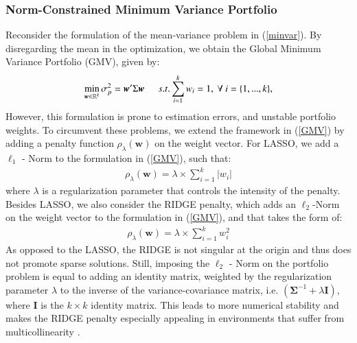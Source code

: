 \documentclass[12pt, a4paper]{article}
\newcommand{\bfw}{\boldsymbol{w} }
\newcommand{\bfSigma}{\boldsymbol{\Sigma} }
\begin{document}
\subsubsection*{Norm-Constrained Minimum Variance Portfolio}
%
Reconsider the formulation of the mean-variance problem in (\ref{minvar}). By disregarding the mean in the optimization, we obtain the Global Minimum Variance Portfolio (GMV), given by:
%
\begin{gather} \label{GMV}
\min_{\bfw \in \mathbb{R}^{k}} \sigma_{p}^{2} = \bfw'\Sigma\bfw \hspace{0.5cm}
s.t. \sum_{i=1}^{k} w_{i} = 1,\ \forall \ i=\{1,...,k\},
\end{gather}
%
However, this formulation is prone to estimation errors, and unstable portfolio weights. To circumvent these problems, we extend the framework in (\ref{GMV}) by adding a penalty function $\rho_{\lambda}(\bfw)$ on the weight vector. For LASSO, we add a $\ell_{1}$ - Norm to the formulation in (\ref{GMV}), such that:
\begin{gather}
\rho_{\lambda}(\bfw) = \lambda \times \sum_{i=1}^{k} |w_{i}|
\end{gather}
where $\lambda$ is a regularization parameter that controls the intensity of the penalty. Besides LASSO, we also consider the RIDGE penalty, which adds an $\ell_{2}$-Norm on the weight vector to the formulation in (\ref{GMV}), and that takes the form of:
\begin{gather}
\rho_{\lambda}(\bfw) = \lambda \times \sum_{i=1}^{k} w_{i}^{2}
\end{gather}
As opposed to the LASSO, the RIDGE is not singular at the origin and thus does not promote sparse solutions. Still, imposing the $\ell_{2}$ - Norm on the portfolio problem is equal to adding an identity matrix, weighted by the regularization parameter $\lambda$ to the inverse of the variance-covariance matrix, i.e. $(\bfSigma^{-1} + \lambda \boldsymbol{I})$, where $\boldsymbol{I}$ is the $k \times k$ identity matrix. This leads to more numerical stability and makes the RIDGE penalty especially appealing in environments that suffer from multicollinearity \citep{Zou2005}.
%
\end{document}

